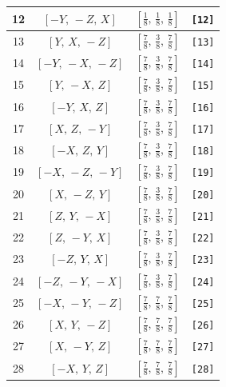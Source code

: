 \documentclass[fleqn,8pt]{jsarticle}
\begin{document}
\begin{longtable}{cccc}
12 & $\left[ - Y,\, - Z,\, X \right]$ & $\left[ \frac{1}{8},\, \frac{1}{8},\, \frac{1}{8} \right]$ & {\tt [12]} \\ \hline
13 & $\left[ Y,\, X,\, - Z \right]$ & $\left[ \frac{7}{8},\, \frac{3}{8},\, \frac{7}{8} \right]$ & {\tt [13]} \\ \hline
14 & $\left[ - Y,\, - X,\, - Z \right]$ & $\left[ \frac{7}{8},\, \frac{3}{8},\, \frac{7}{8} \right]$ & {\tt [14]} \\ \hline
15 & $\left[ Y,\, - X,\, Z \right]$ & $\left[ \frac{7}{8},\, \frac{3}{8},\, \frac{7}{8} \right]$ & {\tt [15]} \\ \hline
16 & $\left[ - Y,\, X,\, Z \right]$ & $\left[ \frac{7}{8},\, \frac{3}{8},\, \frac{7}{8} \right]$ & {\tt [16]} \\ \hline
17 & $\left[ X,\, Z,\, - Y \right]$ & $\left[ \frac{7}{8},\, \frac{3}{8},\, \frac{7}{8} \right]$ & {\tt [17]} \\ \hline
18 & $\left[ - X,\, Z,\, Y \right]$ & $\left[ \frac{7}{8},\, \frac{3}{8},\, \frac{7}{8} \right]$ & {\tt [18]} \\ \hline
19 & $\left[ - X,\, - Z,\, - Y \right]$ & $\left[ \frac{7}{8},\, \frac{3}{8},\, \frac{7}{8} \right]$ & {\tt [19]} \\ \hline
20 & $\left[ X,\, - Z,\, Y \right]$ & $\left[ \frac{7}{8},\, \frac{3}{8},\, \frac{7}{8} \right]$ & {\tt [20]} \\ \hline
21 & $\left[ Z,\, Y,\, - X \right]$ & $\left[ \frac{7}{8},\, \frac{3}{8},\, \frac{7}{8} \right]$ & {\tt [21]} \\ \hline
22 & $\left[ Z,\, - Y,\, X \right]$ & $\left[ \frac{7}{8},\, \frac{3}{8},\, \frac{7}{8} \right]$ & {\tt [22]} \\ \hline
23 & $\left[ - Z,\, Y,\, X \right]$ & $\left[ \frac{7}{8},\, \frac{3}{8},\, \frac{7}{8} \right]$ & {\tt [23]} \\ \hline
24 & $\left[ - Z,\, - Y,\, - X \right]$ & $\left[ \frac{7}{8},\, \frac{3}{8},\, \frac{7}{8} \right]$ & {\tt [24]} \\ \hline
25 & $\left[ - X,\, - Y,\, - Z \right]$ & $\left[ \frac{7}{8},\, \frac{7}{8},\, \frac{7}{8} \right]$ & {\tt [25]} \\ \hline
26 & $\left[ X,\, Y,\, - Z \right]$ & $\left[ \frac{7}{8},\, \frac{7}{8},\, \frac{7}{8} \right]$ & {\tt [26]} \\ \hline
27 & $\left[ X,\, - Y,\, Z \right]$ & $\left[ \frac{7}{8},\, \frac{7}{8},\, \frac{7}{8} \right]$ & {\tt [27]} \\ \hline
28 & $\left[ - X,\, Y,\, Z \right]$ & $\left[ \frac{7}{8},\, \frac{7}{8},\, \frac{7}{8} \right]$ & {\tt [28]} \\ \hline

\end{longtable}
\end{document}
